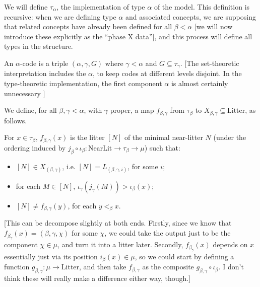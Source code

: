 We will define $\tau_\alpha$, the implementation of type $\alpha$ of the model.  This definition is recursive:  when we are defining type $\alpha$ and associated concepts, we are supposing that related concepts have already been defined for all $\beta<\alpha$ [we will now introduce these explicitly as the “phase X data”], and this process will define all types in the structure.

\begin{definition}
\label {def:code}
\leanok
An $\alpha$-code is a triple $(\alpha,\gamma,G)$ where $\gamma<\alpha$ and $G \subseteq \tau_\gamma$. [The set-theoretic interpretation includes the $\alpha$, to keep codes at different levels disjoint.  In the type-theoretic implementation, the first component $\alpha$ is almost certainly unnecessary ]
\end{definition}

\begin{definition}
\label {def:f-map}
\leanok
We define, for all $\beta,\gamma < \alpha$, with $\gamma$ proper, a map $f_{\beta,\gamma}$ from $\tau_\beta$ to $X_{\beta,\gamma} \subseteq \mathrm{Litter}$, as follows.

For $x \in \tau_\beta$, $f_{\beta,\gamma}(x)$ is the litter $[N]$ of the minimal near-litter $N$ (under the ordering induced by $j_\beta \circ \iota_\beta : \mathrm{NearLit} \to \tau_\beta \to \mu$) such that:
\begin{itemize}
  \item $[N]\in X_{(\beta,\gamma)}$, i.e. $[N] = L_{(\beta,\gamma,i)}$, for some $i$;
  \item for each $M \in [N]$, $\iota_\gamma(j_\gamma(M)) >\iota_\beta(x)$;
  \item $[N] \neq f_{\beta,\gamma}(y)$, for each $y <_\beta x$.
\end{itemize}

[This can be decompose slightly at both ends.  Firstly, since we know that $f_{\beta_\gamma}(x) = (\beta,\gamma,\chi)$ for some $\chi$, we could take the output just to be the component $\chi \in \mu$, and turn it into a litter later.  Secondly, $f_{\beta_\gamma}(x)$ depends on $x$ essentially just via its position $i_\beta(x) \in \mu$, so we could start by defining a function $g_{\beta,\gamma} : \mu \to \mathrm{Litter}$, and then take $f_{\beta,\gamma}$ as the composite $g_{\beta,\gamma} \circ \iota_\beta$.  I don’t think these will really make a difference either way, though.]
\end{definition}

